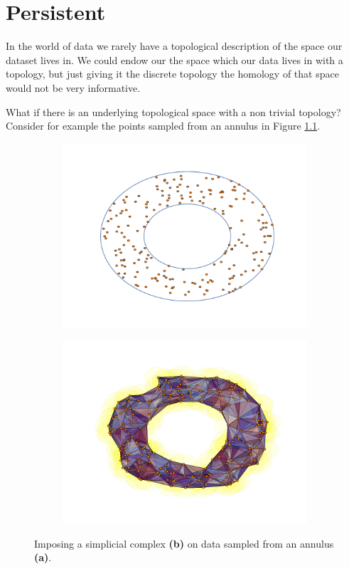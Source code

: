 \chapter{Persistent}
In the world of data we rarely have a topological description of the space our dataset lives in. We could endow our the space which our data lives in with a topology, but just giving it the discrete topology the homology of that space would not be very informative.

What if there is an underlying topological space with a non trivial topology? Consider for example the points sampled from an annulus in Figure \ref{annulus:points}.

\begin{figure}[ht]
  \centering
  \begin{subfigure}[t]{.5\linewidth}
    \includegraphics[scale=.5]{annulus.pdf}
    \caption{\label{annulus:points}}
 \end{subfigure}%
  \begin{subfigure}[t]{.5\linewidth}
    \includegraphics[scale=.5]{annulus_rips.pdf}
    \caption{\label{annulus:imposed}}
 \end{subfigure}
  \caption{\label{annulus} Imposing a simplicial complex \textbf{(b)} on data sampled from an annulus \textbf{(a)}.}
\end{figure}


